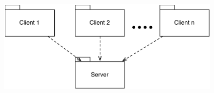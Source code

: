 \begin{figure}%
	\includegraphics[scale=0.5]{input/architectural_design/client-server-architecture-pattern.pdf}%
	\morscaption{}
	\label{fig:client-server}%
\end{figure}